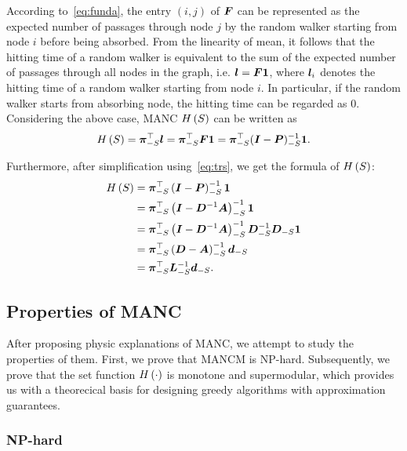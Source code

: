 \documentclass[sigconf]{acmart}
\begin{document}
According to~\eqref{eq:funda}, the entry \((i,j)\) of \(\boldsymbol{F}\) can be represented as the expected number of passages through node \(j\) by the random walker starting from node \(i\) before being absorbed.
From the linearity of mean, it follows that the hitting time of a random walker is equivalent to the sum of the expected number of passages through all nodes in the graph, i.e. \(\boldsymbol{l}=\boldsymbol{F}\boldsymbol{1}\), where \(\boldsymbol{l}_i\) denotes the hitting time of a random walker starting from node \(i\).
In particular, if the random walker starts from absorbing node, the hitting time can be regarded as \(0\).
Considering the above case, MANC \(H\left(S\right)\) can be written as
\[H\left(S\right)=\boldsymbol{\pi}_{-S}^\top\boldsymbol{l}=\boldsymbol{\pi}_{-S}^\top\boldsymbol{F}\boldsymbol{1}=\boldsymbol{\pi}_{-S}^\top(\boldsymbol{I}-\boldsymbol{P})_{-S}^{-1}\boldsymbol{1}.\]

Furthermore, after simplification using~\eqref{eq:trs}, we get the formula of \(H\left(S\right)\):
\begin{equation}\label{eq:MANC}
  \begin{split}
    H\left(S\right) & =\boldsymbol{\pi}_{-S}^\top\left( \boldsymbol{I}-\boldsymbol{P} \right)_{-S}^{-1}\boldsymbol{1}                                    \\
    & =\boldsymbol{\pi}_{-S}^\top\left( \boldsymbol{I}-\boldsymbol{D}^{-1}\boldsymbol{A} \right)_{-S}^{-1}\boldsymbol{1}                          \\
    & =\boldsymbol{\pi}_{-S}^\top\left( \boldsymbol{I}-\boldsymbol{D}^{-1}\boldsymbol{A} \right)_{-S}^{-1}\boldsymbol{D}_{-S}^{-1}\boldsymbol{D}_{-S}\boldsymbol{1} \\
    & =\boldsymbol{\pi}_{-S}^\top\left( \boldsymbol{D}-\boldsymbol{A} \right)_{-S}^{-1}\boldsymbol{d}_{-S}                                \\
    & =\boldsymbol{\pi}_{-S}^\top\boldsymbol{L}_{-S}^{-1}\boldsymbol{d}_{-S}.
  \end{split}
\end{equation}

\subsection{Properties of MANC}

After proposing physic explanations of MANC, we attempt to study the properties of them. First, we prove that MANCM is NP-hard.
Subsequently, we prove that the set function \(H\left(\cdot\right)\) is monotone and supermodular, which provides us with a theorecical basis for designing greedy algorithms with approximation guarantees.

\subsubsection{NP-hard}
\end{document}
